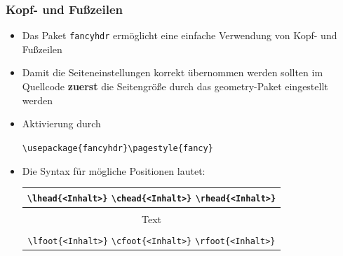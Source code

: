 \begin{frame}[fragile,t]
\frametitle{Kopf- und Fußzeilen}
\begin{itemize}[<+->]
  \item Das Paket {\tt fancyhdr} ermöglicht eine einfache Verwendung von Kopf- und Fußzeilen
  \item Damit die Seiteneinstellungen korrekt übernommen werden sollten im Quellcode \textbf{zuerst} die Seitengröße durch das geometry-Paket eingestellt werden

  \item Aktivierung durch \begin{center}\lstinline[style=Latex]+\usepackage{fancyhdr}\pagestyle{fancy}+\end{center}
\item Die Syntax für mögliche Positionen lautet:\\
  \begin{center} \small
  \begin{tabular}{|c|} \hline
    \lstinline[style=Latex]+\lhead{<Inhalt>}+  \quad \lstinline[style=Latex]+\chead{<Inhalt>}+  \quad \lstinline[style=Latex]+\rhead{<Inhalt>}+  \\\hline\\
    \huge Text \\\\\hline
    \lstinline[style=Latex]+\lfoot{<Inhalt>}+ \quad \lstinline[style=Latex]+\cfoot{<Inhalt>}+ \quad \lstinline[style=Latex]+\rfoot{<Inhalt>}+ \\\hline
  \end{tabular}
  \end{center}
\end{itemize}
\end{frame}


